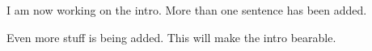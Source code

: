 I am now working on the intro. More than one sentence has been added.

Even more stuff is being added. This will make the intro bearable.